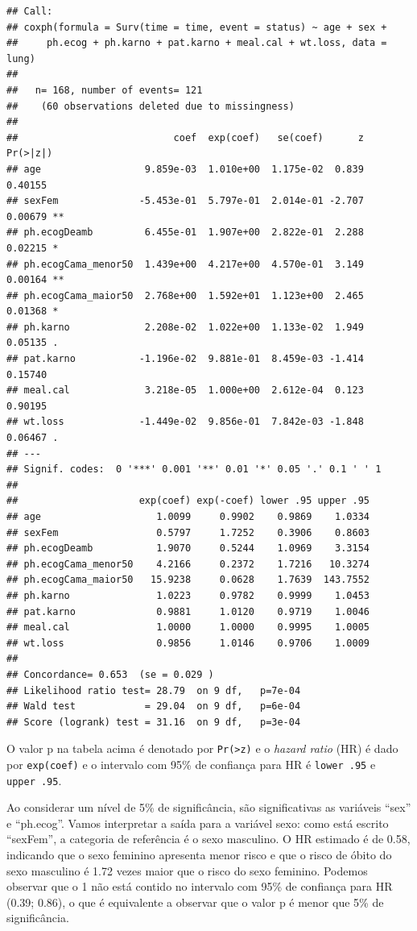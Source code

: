 \documentclass[
]{book}
\begin{document}
\begin{verbatim}
## Call:
## coxph(formula = Surv(time = time, event = status) ~ age + sex + 
##     ph.ecog + ph.karno + pat.karno + meal.cal + wt.loss, data = lung)
## 
##   n= 168, number of events= 121 
##    (60 observations deleted due to missingness)
## 
##                           coef  exp(coef)   se(coef)      z Pr(>|z|)   
## age                  9.859e-03  1.010e+00  1.175e-02  0.839  0.40155   
## sexFem              -5.453e-01  5.797e-01  2.014e-01 -2.707  0.00679 **
## ph.ecogDeamb         6.455e-01  1.907e+00  2.822e-01  2.288  0.02215 * 
## ph.ecogCama_menor50  1.439e+00  4.217e+00  4.570e-01  3.149  0.00164 **
## ph.ecogCama_maior50  2.768e+00  1.592e+01  1.123e+00  2.465  0.01368 * 
## ph.karno             2.208e-02  1.022e+00  1.133e-02  1.949  0.05135 . 
## pat.karno           -1.196e-02  9.881e-01  8.459e-03 -1.414  0.15740   
## meal.cal             3.218e-05  1.000e+00  2.612e-04  0.123  0.90195   
## wt.loss             -1.449e-02  9.856e-01  7.842e-03 -1.848  0.06467 . 
## ---
## Signif. codes:  0 '***' 0.001 '**' 0.01 '*' 0.05 '.' 0.1 ' ' 1
## 
##                     exp(coef) exp(-coef) lower .95 upper .95
## age                    1.0099     0.9902    0.9869    1.0334
## sexFem                 0.5797     1.7252    0.3906    0.8603
## ph.ecogDeamb           1.9070     0.5244    1.0969    3.3154
## ph.ecogCama_menor50    4.2166     0.2372    1.7216   10.3274
## ph.ecogCama_maior50   15.9238     0.0628    1.7639  143.7552
## ph.karno               1.0223     0.9782    0.9999    1.0453
## pat.karno              0.9881     1.0120    0.9719    1.0046
## meal.cal               1.0000     1.0000    0.9995    1.0005
## wt.loss                0.9856     1.0146    0.9706    1.0009
## 
## Concordance= 0.653  (se = 0.029 )
## Likelihood ratio test= 28.79  on 9 df,   p=7e-04
## Wald test            = 29.04  on 9 df,   p=6e-04
## Score (logrank) test = 31.16  on 9 df,   p=3e-04
\end{verbatim}

O valor p na tabela acima é denotado por \texttt{Pr(\textgreater{}\textbar{}z\textbar{})} e o \emph{hazard ratio} (HR) é dado por \texttt{exp(coef)} e o intervalo com 95\% de confiança para HR é \texttt{lower\ .95} e \texttt{upper\ .95}.

Ao considerar um nível de 5\% de significância, são significativas as variáveis ``sex'' e ``ph.ecog''. Vamos interpretar a saída para a variável sexo: como está escrito ``sexFem'', a categoria de referência é o sexo masculino. O HR estimado é de 0.58, indicando que o sexo feminino apresenta menor risco e que o risco de óbito do sexo masculino é 1.72 vezes maior que o risco do sexo feminino. Podemos observar que o 1 não está contido no intervalo com 95\% de confiança para HR (0.39; 0.86), o que é equivalente a observar que o valor p é menor que 5\% de significância.
\end{document}
